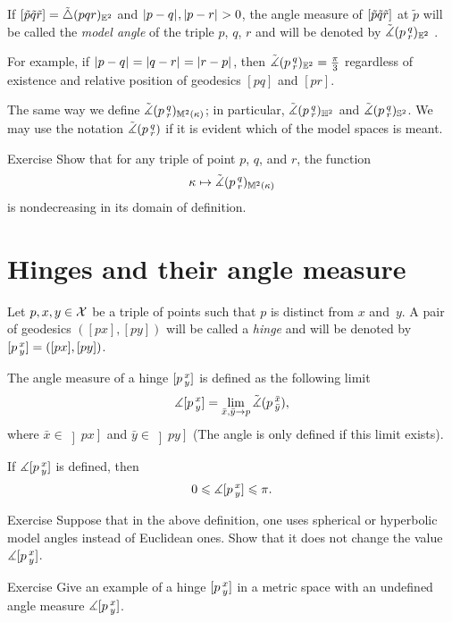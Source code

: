 If 
$[\tilde p\tilde q\tilde r]=\tilde\triangle(p q r)_{\mathbb{E}^2}$ 
and $|{p}-{q}|_{}^{{}},|{p}-{r}|_{}^{{}}>0$, 
the angle measure of 
$[\tilde p\tilde q\tilde r]$ at $\tilde p$ 
will be called the \emph{model angle} of the triple $p$, $q$, $r$ and will be denoted by
$\tilde\measuredangle(p\,{}^{q}_{r})_{\mathbb{E}^2}$%
.\label{page:model-angle}

For example, if $|{p}-{q}|_{}^{{}}=|{q}-{r}|_{}^{{}}=|{r}-{p}|_{}^{{}}$, then $\tilde\measuredangle(p\,{}^{q}_{r})_{\mathbb{E}^2}=\tfrac\pi3$ regardless of existence and relative position of geodesics $[pq]$ and $[pr]$.

The same way we define $\tilde\measuredangle(p\,{}^{q}_{r})_{\mathbb{M}^2(\kappa)}$;
in particular, $\tilde\measuredangle(p\,{}^{q}_{r})_{\mathbb{H}^2}$ and $\tilde\measuredangle(p\,{}^{q}_{r})_{\mathbb{S}^2}$.
We may use the notation $\tilde\measuredangle(p\,{}^{q}_{r})$ if it is evident which of the model spaces is meant.

\begin{thm}{Exercise}\label{ex:k-><mono}
Show that for any triple of point $p$, $q$, and $r$,
the function
\[\kappa\mapsto \tilde\measuredangle(p\,{}^{q}_{r})_{\mathbb{M}^2(\kappa)}\]
is nondecreasing in its domain of definition.
\end{thm}


\section{Hinges and their angle measure}\label{sec:angles}

 Let $p,x,y\in \mathcal{X}$ be a triple of points such that $p$ is distinct from $x$ and~$y$.
A pair of geodesics $([p x],[p y])$ will be called  a \emph{hinge} and will be denoted by 
$[p\,{}^{x}_{y}]=([p x],[p y])$.

The angle measure of a hinge $[p\,{}^{x}_{y}]$ is defined as the following limit
\[\measuredangle[p\,{}^{x}_{y}]=\lim_{\bar x,\bar y\to p} \tilde\measuredangle(p\,{}^{\bar x}_{\bar y}),\]
where $\bar x\in\left]p x\right]$ and $\bar y\in\left]p y\right]$ (The angle is only defined if this limit exists).

If $\measuredangle[p\,{}^{x}_{y}]$ is defined, then
\[0\leqslant \measuredangle[p\,{}^{x}_{y}]\leqslant \pi.\]

\begin{thm}{Exercise}\label{ex:angkK}
Suppose that in the above definition, one uses spherical or hyperbolic model angles instead of Euclidean ones.
Show that it does not change the value $\measuredangle[p\,{}^{x}_{y}]$.
\end{thm}


\begin{thm}{Exercise}\label{ex:undefined-angle}
Give an example of a hinge $[p\,{}^{x}_{y}]$ in a metric space with an undefined angle measure $\measuredangle[p\,{}^{x}_{y}]$.
\end{thm}


